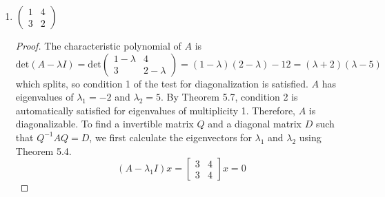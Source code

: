 \documentclass[11pt]{scrartcl}
\begin{document}
\begin{enumerate}[label=\alph*.]
{\begin{proof}
\begin{align*}
\begin{bmatrix}
				      \frac12 & -\frac12 \\
				      \frac12 & \frac12
			      \end{bmatrix}                \\
			      D      & = Q^{-1} A Q                       \\
			             & =
			      \begin{bmatrix}
				      \frac12 & -\frac12 \\
				      \frac12 & \frac12
			      \end{bmatrix}
			      \begin{bmatrix}
				      1 & 3 \\
				      3 & 1
			      \end{bmatrix}
			      \begin{bmatrix}
				      1  & 1 \\
				      -1 & 1
			      \end{bmatrix}                  \\
			             & =
			      \begin{bmatrix}
				      -2 & 0 \\
				      0  & 4
			      \end{bmatrix}
		      \end{align*}
		      as desired.
	      \end{proof}
	      }
	\item{
	      $\left(\begin{array}{ll}1 & 4 \\ 3 & 2\end{array}\right)$
	      \begin{proof}
		      The characteristic polynomial of $A$ is
		      \[
			      \text{det}(A - \lambda I ) = \text{det}\left(\begin{array}{ll}1 - \lambda & 4 \\ 3 & 2 - \lambda \end{array}\right)
			      = (1 - \lambda)(2 - \lambda) - 12 = (\lambda + 2) (\lambda - 5)
		      \]
		      which splits, so condition 1 of the test for diagonalization is satisfied.
		      $A$ has eigenvalues of $\lambda_1 = -2 $ and $\lambda_2 = 5$.
		      By Theorem 5.7, condition 2 is automatically satisfied for eigenvalues of multiplicity 1.
		      Therefore, $A$ is diagonalizable.
		      To find a invertible matrix $Q$ and a diagonal matrix $D$ such that $Q^{-1} A Q=D$, we first
		      calculate the eigenvectors for $\lambda_1$ and $\lambda_2$ using Theorem 5.4.
		      \[
			      (A - \lambda_1I)x =  \begin{bmatrix}3 & 4 \\ 3 & 4 \end{bmatrix}x = 0
\]
\end{proof}}
\end{enumerate}
\end{document}
